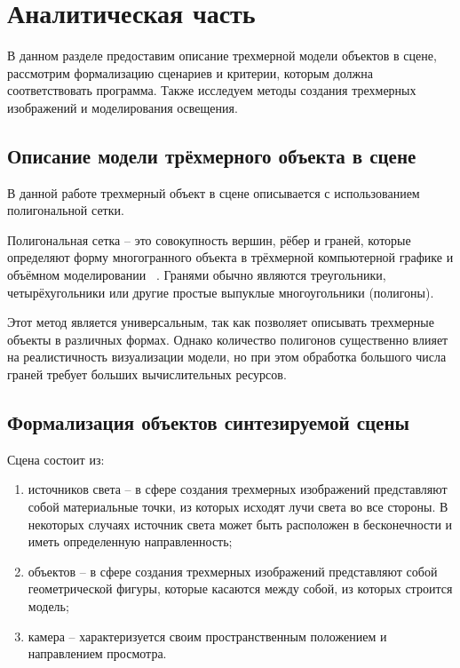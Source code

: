 \chapter{Аналитическая часть}

В данном разделе предоставим описание трехмерной модели объектов в сцене, рассмотрим формализацию сценариев и критерии, которым должна соответствовать программа. 
Также исследуем методы создания трехмерных изображений и моделирования освещения.

\section{Описание модели трёхмерного объекта в сцене}

В данной работе трехмерный объект в сцене описывается с использованием полигональной сетки.

Полигональная сетка -- это совокупность вершин, рёбер и граней, которые определяют форму многогранного объекта в трёхмерной компьютерной графике и объёмном моделировании~\cite{rodgers} . 
Гранями обычно являются треугольники, четырёхугольники или другие простые выпуклые многоугольники (полигоны).

Этот метод является универсальным, так как позволяет описывать трехмерные объекты в различных формах. 
Однако количество полигонов существенно влияет  на реалистичность визуализации модели, но при этом обработка большого числа граней требует больших вычислительных ресурсов.

\section{Формализация объектов синтезируемой сцены}

Сцена состоит из:

\begin{enumerate}[label={\arabic*)}]
	\item источников света -- в сфере создания трехмерных изображений
	представляют собой материальные точки, из которых исходят лучи света
	во все стороны. В некоторых случаях источник света может быть
	расположен в бесконечности и иметь определенную направленность;
	\item объектов -- в сфере создания трехмерных изображений представляют
	собой геометрической фигуры, которые касаются между собой, из
	которых строится модель;
	\item камера -- характеризуется своим пространственным положением и
	направлением просмотра.
\end{enumerate}

